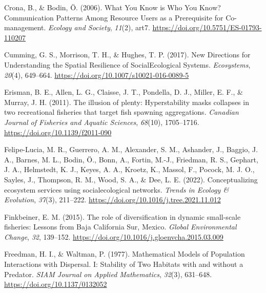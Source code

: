 \documentclass[
  12pt,
]{article}
\newlength{\cslhangindent}
\newlength{\cslentryspacingunit} %
\newenvironment{CSLReferences}[2] %
 {%
  \setlength{\parindent}{0pt}
  \ifodd #1
  \let\oldpar\par
  \def\par{\hangindent=\cslhangindent\oldpar}
  \fi
  \setlength{\parskip}{#2\cslentryspacingunit}
 }%
 {}
\begin{document}
\begin{CSLReferences}{1}{2}
\leavevmode{}%
Crona, B., \& Bodin, Ö. (2006). What {You Know} is {Who You Know}? {Communication Patterns Among Resource Users} as a {Prerequisite} for {Co-management}. \emph{Ecology and Society}, \emph{11}(2), art7. \url{https://doi.org/10.5751/ES-01793-110207}

\leavevmode{}%
Cumming, G. S., Morrison, T. H., \& Hughes, T. P. (2017). New {Directions} for {Understanding} the {Spatial Resilience} of {Social}{\textendash}{Ecological Systems}. \emph{Ecosystems}, \emph{20}(4), 649--664. \url{https://doi.org/10.1007/s10021-016-0089-5}

\leavevmode{}%
Erisman, B. E., Allen, L. G., Claisse, J. T., Pondella, D. J., Miller, E. F., \& Murray, J. H. (2011). The illusion of plenty: Hyperstability masks collapses in two recreational fisheries that target fish spawning aggregations. \emph{Canadian Journal of Fisheries and Aquatic Sciences}, \emph{68}(10), 1705--1716. \url{https://doi.org/10.1139/f2011-090}

\leavevmode{}%
Felipe-Lucia, M. R., Guerrero, A. M., Alexander, S. M., Ashander, J., Baggio, J. A., Barnes, M. L., Bodin, Ö., Bonn, A., Fortin, M.-J., Friedman, R. S., Gephart, J. A., Helmstedt, K. J., Keyes, A. A., Kroetz, K., Massol, F., Pocock, M. J. O., Sayles, J., Thompson, R. M., Wood, S. A., \& Dee, L. E. (2022). Conceptualizing ecosystem services using social{\textendash}ecological networks. \emph{Trends in Ecology \& Evolution}, \emph{37}(3), 211--222. \url{https://doi.org/10.1016/j.tree.2021.11.012}

\leavevmode{}%
Finkbeiner, E. M. (2015). The role of diversification in dynamic small-scale fisheries: {Lessons} from {Baja California Sur}, {Mexico}. \emph{Global Environmental Change}, \emph{32}, 139--152. \url{https://doi.org/10.1016/j.gloenvcha.2015.03.009}

\leavevmode{}%
Freedman, H. I., \& Waltman, P. (1977). Mathematical {Models} of {Population Interactions} with {Dispersal}. {I}: {Stability} of {Two Habitats} with and without a {Predator}. \emph{SIAM Journal on Applied Mathematics}, \emph{32}(3), 631--648. \url{https://doi.org/10.1137/0132052}


\end{CSLReferences}
\end{document}
